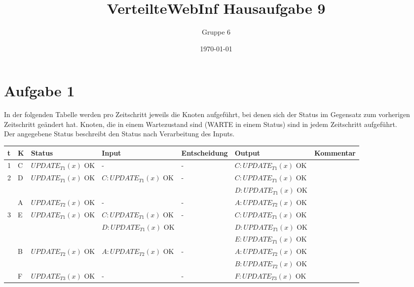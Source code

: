 \documentclass[a4paper]{article}
\author{Gruppe 6}
\title{\textbf{VerteilteWebInf Hausaufgabe 9}}
\date{\today}
\begin{document}
\maketitle


\section*{Aufgabe 1}
In der folgenden Tabelle werden pro Zeitschritt jeweils die Knoten aufgeführt, bei denen sich der Status im Gegensatz zum vorherigen Zeitschritt geändert hat. Knoten, die in einem Wartezustand sind (WARTE in einem Status) sind in jedem Zeitschritt aufgeführt.\\
Der angegebene Status beschreibt den Status nach Verarbeitung des Inputs.


\newpage
\begin{landscape}



\begin{tabular}{| l | l | l | l | l | l | p{6cm} |}
\hline
t & K & Status & Input & Entscheidung & Output & Kommentar \\
\hline
\hline


1 & C & $UPDATE_{T1}(x)$ OK & - & - & $C: UPDATE_{T1}(x)$ OK & \\
\hline
\hline


2 & \multirow{2}{*}{D} 
			&	$UPDATE_{T1}(x)$ OK 		& $C: UPDATE_{T1}(x)$ OK	& - &	 $C: UPDATE_{T1}(x)$ OK &\\
			& &															& 															   &   &	 $D: UPDATE_{T1}(x)$ OK &\\
\cline{2-7}
   & A & $UPDATE_{T2}(x)$ OK & - & - & $A: UPDATE_{T2}(x)$ OK & \\
\hline
\hline


3 & \multirow{3}{*}{E} 
			&	$UPDATE_{T1}(x)$ OK 		& $C: UPDATE_{T1}(x)$ OK	& - &	 $C: UPDATE_{T1}(x)$ OK &\\
			& &															& $D: UPDATE_{T1}(x)$ OK &   &		 $D: UPDATE_{T1}(x)$ OK &\\
			& &															&																	& 	& 	 $E: UPDATE_{T1}(x)$ OK & \\

\cline{2-7}
& \multirow{2}{*}{B} 
			&	$UPDATE_{T2}(x)$ OK 		& $A: UPDATE_{T2}(x)$ OK	& - &	 $A: UPDATE_{T2}(x)$ OK &\\
			& &															& 															   &   &	 $B: UPDATE_{T2}(x)$ OK &\\
\cline{2-7}
 	& F & $UPDATE_{T3}(x)$ OK & - & - & $F: UPDATE_{T3}(x)$ OK & \\
\hline
\hline



\end{tabular}
\end{landscape}
\end{document}
